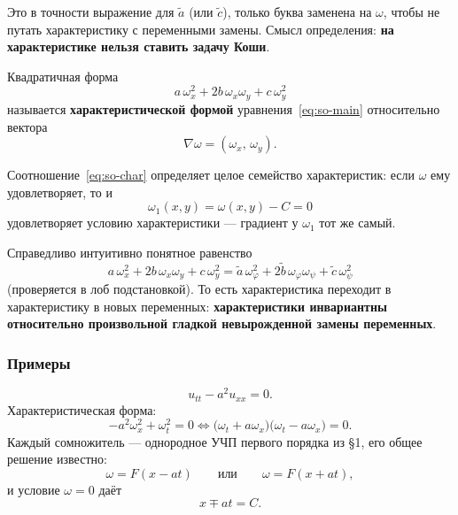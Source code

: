 \begin{remark}
Это в точности выражение для $\widetilde a$ (или $\widetilde c$), только буква
заменена на $\omega$, чтобы не путать характеристику с переменными замены.
Смысл определения: \textbf{на характеристике нельзя ставить задачу Коши}.
\end{remark}

\begin{definition}
Квадратичная форма
\[
  a\,\omega_x^2 + 2b\,\omega_x \omega_y + c\,\omega_y^2
\]
называется \textbf{характеристической формой} уравнения~\eqref{eq:so-main}
относительно вектора
\[
  \nabla\omega = (\omega_x,\, \omega_y) .
\]
\end{definition}

\begin{remark}[замечание 1]
Соотношение~\eqref{eq:so-char} определяет целое семейство характеристик: если
$\omega$ ему удовлетворяет, то и
\[
  \omega_1(x,y) = \omega(x,y) - C = 0
\]
удовлетворяет условию характеристики — градиент у $\omega_1$ тот же самый.
\end{remark}

\begin{remark}[замечание 2]
Справедливо интуитивно понятное равенство
\[
  a\,\omega_x^2 + 2b\,\omega_x \omega_y + c\,\omega_y^2
  = \widetilde a\,\omega_\varphi^2
  + 2\widetilde b\,\omega_\varphi \omega_\psi
  + \widetilde c\,\omega_\psi^2
\]
(проверяется в лоб подстановкой). То есть характеристика переходит в
характеристику в новых переменных: \textbf{характеристики инвариантны
относительно произвольной гладкой невырожденной замены переменных}.
\end{remark}

\subsubsection*{Примеры}

\begin{example}
\[
  u_{tt} - a^2 u_{xx} = 0 .
\]
Характеристическая форма:
\[
  -a^2 \omega_x^2 + \omega_t^2 = 0
  \iff
  \big(\omega_t + a\omega_x\big)\big(\omega_t - a\omega_x\big) = 0 .
\]
Каждый сомножитель — однородное УЧП первого порядка из \S1, его общее решение
известно:
\[
  \omega = F(x - at)
  \qquad\text{или}\qquad
  \omega = F(x + at) ,
\]
и условие $\omega = 0$ даёт
\[
  x \mp at = C .
\]
\end{example}


